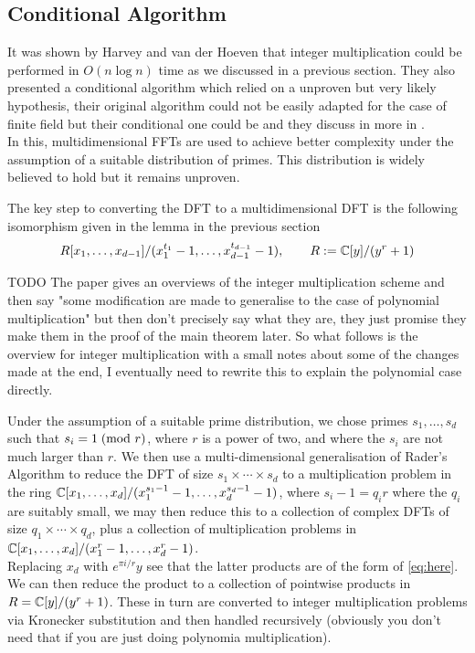 
\subsection{Conditional Algorithm}

It was shown by Harvey and van der Hoeven \cite{nlogn} that integer multiplication could be performed in $O(n\log n)$ time as we discussed in a previous section. They also presented a conditional algorithm which relied on a unproven but very likely hypothesis, their original algorithm could not be easily adapted for the case of finite field but their conditional one could be and they discuss in more in \cite{ffnlogn}.\\
In this, multidimensional FFTs are used to achieve better complexity under the assumption of a suitable distribution of primes. This distribution is widely believed to hold but it remains unproven.

The key step to converting the DFT to a multidimensional DFT is the following isomorphism given in the lemma in the previous section
\begin{equation}\label{eq:here}
    R[x_1, \ldots, x_{d-1}] / (x_1^{t_1} - 1, \ldots, x_{d-1}^{t_{d-1}} - 1), \qquad R := {\mathbb C}[y]/(y^r + 1)
\end{equation}

TODO The paper gives an overviews of the integer multiplication scheme and then say "some modification are made to generalise to the case of polynomial multiplication" but then don't precisely say what they are, they just promise they make them in the proof of the main theorem later. So what follows is the overview for integer multiplication with a small notes about some of the changes made at the end, I eventually need to rewrite this to explain the polynomial case directly.
\medskip

Under the assumption of a suitable prime distribution, we chose primes $s_1, \ldots, s_d$ such that $s_i = 1 \;(\textrm{mod } r)$, where $r$ is a power of two, and where the $s_i$ are not much larger than $r$. We then use a multi-dimensional generalisation of Rader's Algorithm to reduce the DFT of size $s_1 \times \cdots \times s_d$ to a multiplication problem in the ring ${\mathbb C}[x_1, \ldots, x_d] / (x_1^{s_1 - 1} - 1, \ldots, x_d^{s_d - 1} - 1)$, where $s_i - 1 = q_i r$ where the $q_i$ are suitably small, we may then reduce this to a collection of complex DFTs of size $q_1 \times \cdots \times q_d$, plus a collection of multiplication problems in ${\mathbb C}[x_1, \ldots, x_d] / (x_1^r - 1, \ldots, x_d^r - 1)$. \\
Replacing $x_d$ with $e^{\pi i / r}y$ see that the latter products are of the form of \ref{eq:here}.  We can then reduce the product to a collection of pointwise products in $R = {\mathbb C}[y] / (y^r + 1)$. These in turn are converted to integer multiplication problems via Kronecker substitution and then handled recursively (obviously you don't need that if you are just doing polynomia multiplication).

